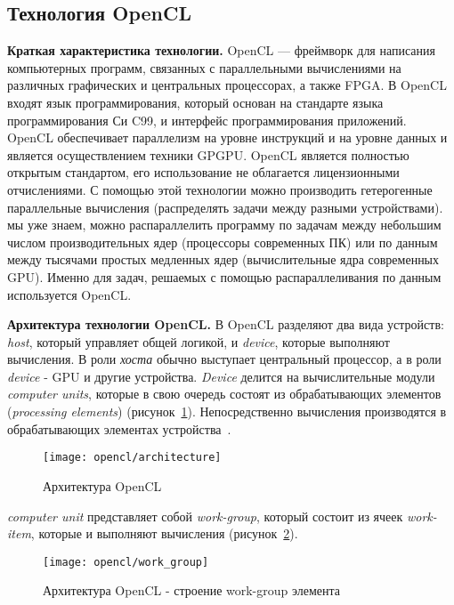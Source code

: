 { %
	\subsection{Технология OpenCL}
	\label{OpenCL:section}
	\par\textbf{Краткая характеристика технологии.} OpenCL — фреймворк для написания компьютерных программ, связанных с параллельными вычислениями на различных графических и центральных процессорах, а также FPGA. В OpenCL входят язык программирования, который основан на стандарте языка программирования Си C99, и интерфейс программирования приложений. OpenCL обеспечивает параллелизм на уровне инструкций и на уровне данных и является осуществлением техники GPGPU. OpenCL является полностью открытым стандартом, его использование не облагается лицензионными отчислениями. С помощью этой технологии можно производить гетерогенные параллельные вычисления (распределять задачи между разными устройствами).
	 мы уже знаем, можно распараллелить программу по задачам между небольшим числом производительных ядер (процессоры современных ПК) или по данным между тысячами простых медленных ядер (вычислительные ядра современных GPU). Именно для задач, решаемых с помощью распараллеливания по данным используется OpenCL.
	\par\textbf{Архитектура технологии OpenCL.} В OpenCL разделяют два вида устройств: \textit{host}, который управляет общей логикой, и \textit{device}, которые выполняют вычисления. В роли \textit{хоста} обычно выступает центральный процессор, а в роли \textit{device} - GPU и другие устройства. \textit{Device} делится на вычислительные модули \textit{computer units}, которые в свою очередь состоят из обрабатывающих элементов (\textit{processing elements}) (рисунок~\ref{OpenCLArchitecture:image}). Непосредственно вычисления производятся в обрабатывающих элементах устройства~\cite{Bastrakov2011}.
	\begin{figure}[H]
		\texttt{[image: opencl/architecture]}
		\caption{Архитектура OpenCL}
		\label{OpenCLArchitecture:image}
	\end{figure}
	 \textit{computer unit} представляет собой \textit{work-group}, который состоит из ячеек \textit{work-item}, которые и выполняют вычисления (рисунок~\ref{OpenCLWorkGroup:image}).
	\begin{figure}[H]
		\texttt{[image: opencl/work\_group]}
		\caption{Архитектура OpenCL - строение work-group элемента}
		\label{OpenCLWorkGroup:image}
	\end{figure}
}
